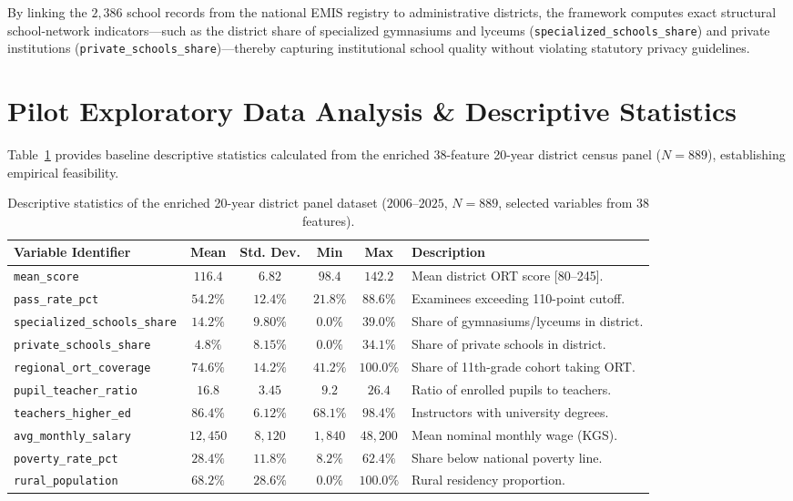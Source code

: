 \documentclass[12pt,letterpaper]{report}
\begin{document}
By linking the $2,386$ school records from the national EMIS registry to administrative districts, the framework computes exact structural school-network indicators—such as the district share of specialized gymnasiums and lyceums (\texttt{specialized\_schools\_share}) and private institutions (\texttt{private\_schools\_share})—thereby capturing institutional school quality without violating statutory privacy guidelines.

\section{Pilot Exploratory Data Analysis \& Descriptive Statistics}
Table~\ref{tab:eda_stats} provides baseline descriptive statistics calculated from the enriched 38-feature 20-year district census panel ($N = 889$), establishing empirical feasibility.

\begin{table}[htbp]
\centering
\begin{singlespace}
\small
\caption{Descriptive statistics of the enriched 20-year district panel dataset ($2006\text{--}2025$, $N = 889$, selected variables from 38 features).}
\label{tab:eda_stats}
\begin{tabularx}{\textwidth}{l c c c c X}
\toprule
\textbf{Variable Identifier} & \textbf{Mean} & \textbf{Std. Dev.} & \textbf{Min} & \textbf{Max} & \textbf{Description} \\
\midrule
\texttt{mean\_score} & $116.4$ & $6.82$ & $98.4$ & $142.2$ & Mean district ORT score [80--245]. \\
\texttt{pass\_rate\_pct} & $54.2\%$ & $12.4\%$ & $21.8\%$ & $88.6\%$ & Examinees exceeding 110-point cutoff. \\
\texttt{specialized\_schools\_share} & $14.2\%$ & $9.80\%$ & $0.0\%$ & $39.0\%$ & Share of gymnasiums/lyceums in district. \\
\texttt{private\_schools\_share} & $4.8\%$ & $8.15\%$ & $0.0\%$ & $34.1\%$ & Share of private schools in district. \\
\texttt{regional\_ort\_coverage} & $74.6\%$ & $14.2\%$ & $41.2\%$ & $100.0\%$ & Share of 11th-grade cohort taking ORT. \\
\texttt{pupil\_teacher\_ratio} & $16.8$ & $3.45$ & $9.2$ & $26.4$ & Ratio of enrolled pupils to teachers. \\
\texttt{teachers\_higher\_ed} & $86.4\%$ & $6.12\%$ & $68.1\%$ & $98.4\%$ & Instructors with university degrees. \\
\texttt{avg\_monthly\_salary} & $12,450$ & $8,120$ & $1,840$ & $48,200$ & Mean nominal monthly wage (KGS). \\
\texttt{poverty\_rate\_pct} & $28.4\%$ & $11.8\%$ & $8.2\%$ & $62.4\%$ & Share below national poverty line. \\
\texttt{rural\_population} & $68.2\%$ & $28.6\%$ & $0.0\%$ & $100.0\%$ & Rural residency proportion. \\
\bottomrule
\end{tabularx}
\end{singlespace}
\end{table}
\end{document}
